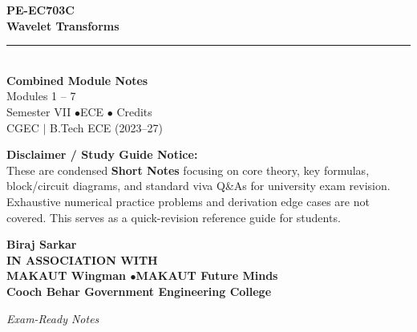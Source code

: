 \documentclass[12pt,a4paper]{article}
\begin{document}
\thispagestyle{empty}


\vspace*{1.0cm}
\begin{center}
  {\Huge\bfseries\color{myred} PE-EC703C}\\[10pt]
  {\LARGE\bfseries\color{mydark} Wavelet Transforms}\\[20pt]
  {\color{myred}\rule{0.7\linewidth}{1.5pt}}\\[18pt]
  {\Large\color{myteal}\textbf{Combined Module Notes}}\\[8pt]
  {\large\color{mydark} Modules 1 -- 7}\\[40pt]
  {\normalsize\color{mydark} Semester VII \quad$\bullet$\quad ECE \quad$\bullet$ Credits}\\[12pt]
  {\normalsize\color{mydark} CGEC \;$|$\; B.Tech ECE (2023--27)}
\end{center}
\vspace{1.0cm}
\begin{center}
  \begin{tcolorbox}[colback=mygray, colframe=mgframe, boxrule=0.5pt, arc=3pt, width=0.85\linewidth]
    \centering\small\color{mydark}
    \textbf{Disclaimer / Study Guide Notice:}\\
    These are condensed \textbf{Short Notes} focusing on core theory, key formulas, block/circuit diagrams, and standard viva Q\&As for university exam revision. Exhaustive numerical practice problems and derivation edge cases are not covered. This serves as a quick-revision reference guide for students.
  \end{tcolorbox}
\end{center}
\vfill
\vspace{0.6cm}
\begin{center}
  {\large\bfseries\color{mypurple} Biraj Sarkar}\\[16pt]
  {\footnotesize\color{watermark}\textbf{IN ASSOCIATION WITH}}\\[8pt]
  {\small\bfseries\color{mydark} MAKAUT Wingman \quad$\bullet$\quad MAKAUT Future Minds}\\[12pt]
  {\large\bfseries\color{myteal} Cooch Behar Government Engineering College}
\end{center}
\vfill
\begin{center}{\small\color{watermark}\textit{Exam-Ready Notes}}\end{center}
\clearpage
\end{document}

